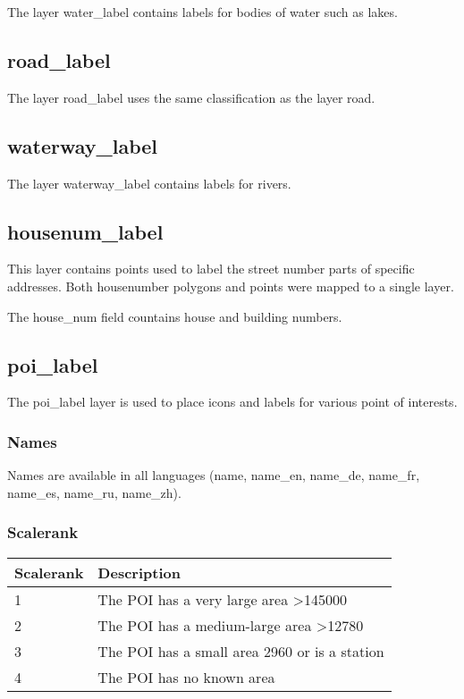 The layer water\_label contains labels for bodies of water such as
lakes.

\subsection*{road\_label}\label{road_label}

The layer road\_label uses the same classification as the layer road.

\subsection*{waterway\_label}\label{waterway_label}

The layer waterway\_label contains labels for rivers.

\subsection*{housenum\_label}\label{housenum_label}

This layer contains points used to label the street number parts of
specific addresses. Both housenumber polygons and points were mapped to
a single layer.

The house\_num field countains house and building numbers.

\subsection*{poi\_label}\label{poi_label}

The poi\_label layer is used to place icons and labels for various point
of interests.

\subsubsection*{Names}\label{names}

Names are available in all languages (name, name\_en, name\_de,
name\_fr, name\_es, name\_ru, name\_zh).

\subsubsection*{Scalerank}\label{scalerank}

\begin{table}[H]
\label{my-label}
\begin{tabular}{l | l}
Scalerank & Description                                       \\ \hline
1         & The POI has a very large area \textgreater145000  \\
2         & The POI has a medium-large area \textgreater12780 \\
3         & The POI has a small area 2960 or is a station     \\
4         & The POI has no known area                        
\end{tabular}
\end{table}

